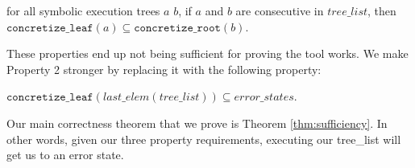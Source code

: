\begin{property}
  \label{prop:stitch}
for all symbolic execution trees $a$ $b$, 
if $a$ and $b$ are consecutive in $tree\_list$, then 
$\mathtt{concretize\_leaf} (a) \subseteq
\mathtt{concretize\_root}(b) $.
\end{property}

These properties end up not being sufficient for proving the tool works. 
We make Property 2 stronger by replacing it with the following property:

\setcounter{property}{1}
\renewcommand{\theproperty}{Z.\arabic{property}'}
\begin{property}
  \label{prop:correctedz2}
$\mathtt{concretize\_leaf} (last\_elem (tree\_list))
\subseteq error\_states $.
\end{property}



Our main correctness theorem that we prove is Theorem \ref{thm:sufficiency}. In other words, given our three property requirements, executing our tree\_list will get us to an error state.
